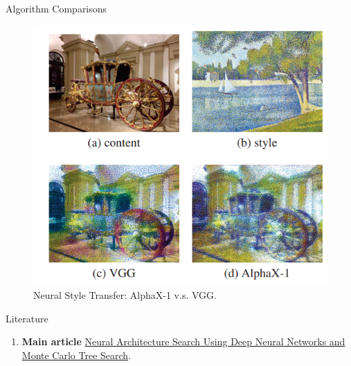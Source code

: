 \documentclass{beamer}
\begin{document}
\begin{frame}{Algorithm Comparisons}
    \begin{figure}
        \centering
        \includegraphics[scale=0.65]{images/nas12.png}
        \caption{Neural Style Transfer: AlphaX-1 v.s. VGG.}
        \label{fig:enter-label}
    \end{figure}
\end{frame}



\begin{frame}{Literature}
    \begin{enumerate}
        \item \textbf{Main article} \href{file:///C:/Users/79267/Downloads/Neural_Architecture_Search_Using_Deep_Neural_Netwo.pdf}
        {Neural Architecture Search Using Deep
Neural Networks and Monte Carlo Tree Search}.
    \end{enumerate}
\end{frame}




\end{document}
